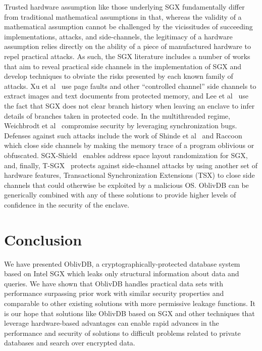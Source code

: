 \documentclass[letterpaper,twocolumn,10pt]{article}
\def\name/{OblivDB}
\begin{document}
Trusted hardware assumption like those underlying SGX fundamentally differ from traditional mathematical assumptions in that, whereas the validity of a mathematical assumption cannot be challenged by the vicissitudes of succeeding implementations, attacks, and side-channels, the legitimacy of a hardware assumption relies directly on the ability of a piece of manufactured hardware to repel practical attacks. As such, the SGX literature includes a number of works that aim to reveal practical side channels in the implementation of SGX and develop techniques to obviate the risks presented by each known family of attacks. Xu et al~\cite{XCP15} use page faults and other ``controlled channel'' side channels to extract images and text documents from protected memory, and Lee et al~\cite{LSG+16} use the fact that SGX does not clear branch history when leaving an enclave to infer details of branches taken in protected code. In the multithreaded regime, Weichbrodt et al~\cite{WKPK16} compromise security by leveraging synchronization bugs. Defenses against such attacks include the work of Shinde et al~\cite{SCNS16} and Raccoon~\cite{RLT15} which close side channels by making the memory trace of a program oblivious or obfuscated. SGX-Shield~\cite{SLK+17} enables address space layout randomization for SGX, and, finally, T-SGX~\cite{SLKP17} protects against side-channel attacks by using another set of hardware features, Transactional Synchronization Extensions (TSX) to close side channels that could otherwise be exploited by a malicious OS. \name/ can be generically combined with any of these solutions to provide higher levels of confidence in the security of the enclave.  

\section{Conclusion}\label{conclusion}
We have presented \name/, a cryptographically-protected database system based on Intel SGX which leaks only structural information about data and queries. We have shown that \name/ handles practical data sets with performance surpassing prior work with similar security properties and comparable to other existing solutions with more permissive leakage functions. It is our hope that solutions like \name/ based on SGX and other techniques that leverage hardware-based advantages can enable rapid advances in the performance and security of solutions to difficult problems related to private databases and search over encrypted data. 


{\footnotesize 
}
 

\end{document}
